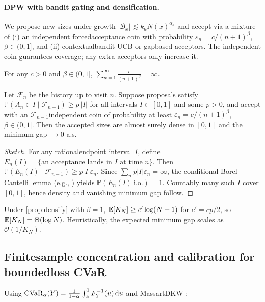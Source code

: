 \paragraph{DPW with bandit gating and densification.}
We propose new sizes under growth $|\mathcal{B}_x|\lesssim k_a N(x)^{\alpha_a}$ and accept via a mixture of (i) an independent forced\textendash acceptance coin with probability $\varepsilon_n=c/(n+1)^\beta$, $\beta\in(0,1]$, and (ii) contextual\textendash bandit UCB or gap\textendash based acceptors. The independent coin guarantees coverage; any extra acceptors only increase it.

\begin{lemma}
For any $c>0$ and $\beta\in(0,1]$, $\sum_{n=1}^{\infty} \frac{c}{(n+1)^\beta}=\infty$.
\end{lemma}

\begin{proposition}\label{prop:densify}
Let $\mathcal{F}_{n}$ be the history up to visit $n$. Suppose proposals satisfy $\mathbb{P}(A_n\in I\mid \mathcal{F}_{n-1})\ge p\,|I|$ for all intervals $I\subset[0,1]$ and some $p>0$, and accept with an $\mathcal{F}_{n-1}$\textendash independent coin of probability at least $\varepsilon_n=c/(n+1)^\beta$, $\beta\in(0,1]$. Then the accepted sizes are almost surely dense in $[0,1]$ and the minimum gap $\to 0$ a.s.
\end{proposition}
\begin{proof}[Sketch]
For any rational\textendash endpoint interval $I$, define $E_n(I)=\{\text{an acceptance lands in }I\text{ at time }n\}$. Then
$
\mathbb{P}(E_n(I)\mid \mathcal{F}_{n-1})\ge p|I|\varepsilon_n.
$
Since $\sum_n p|I|\varepsilon_n=\infty$, the conditional Borel–Cantelli lemma (e.g., \cite[Thm.~4.3.4]{durrett2019probability}) yields $\mathbb{P}(E_n(I)\ \text{i.o.})=1$. Countably many such $I$ cover $[0,1]$, hence density and vanishing minimum gap follow.
\end{proof}

\begin{corollary}\label{cor:expect}
Under \cref{prop:densify} with $\beta=1$, $\mathbb{E}[K_N]\ge c' \log(N+1)$ for $c'=cp/2$, so $\mathbb{E}[K_N]=\Theta(\log N)$. Heuristically, the expected minimum gap scales as $\mathcal{O}(1/K_N)$.
\end{corollary}

\subsection{Finite\textendash sample concentration and calibration for bounded\textendash loss CVaR}
Using $\mathrm{CVaR}_\alpha(Y)=\frac{1}{1-\alpha}\int_\alpha^1 F_Y^{-1}(u)\,\mathrm{d}u$ \cite{rockafellar2000cvar} and Massart\textendash DKW \cite{massart1990dkw}:

